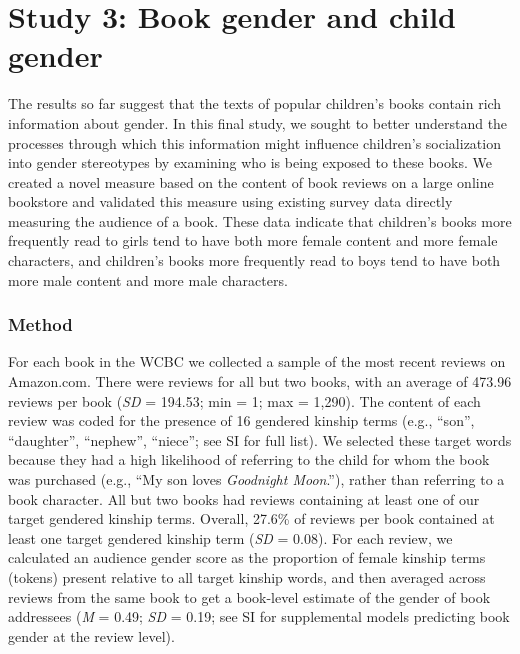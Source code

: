 \documentclass[
  english,
  ,man,floatsintext]{apa6}
\begin{document}
\hypertarget{study-3-book-gender-and-child-gender}{%
\section{Study 3: Book gender and child gender}\label{study-3-book-gender-and-child-gender}}

The results so far suggest that the texts of popular children's books contain rich information about gender. In this final study, we sought to better understand the processes through which this information might influence children's socialization into gender stereotypes by examining who is being exposed to these books. We created a novel measure based on the content of book reviews on a large online bookstore and validated this measure using existing survey data directly measuring the audience of a book. These data indicate that children's books more frequently read to girls tend to have both more female content and more female characters, and children's books more frequently read to boys tend to have both more male content and more male characters.

\hypertarget{method-3}{%
\subsubsection{Method}\label{method-3}}

For each book in the WCBC we collected a sample of the most recent reviews on Amazon.com. There were reviews for all but two books, with an average of 473.96 reviews per book (\emph{SD} = 194.53; min = 1; max = 1,290). The content of each review was coded for the presence of 16 gendered kinship terms (e.g., \enquote{son}, \enquote{daughter}, \enquote{nephew}, \enquote{niece}; see SI for full list). We selected these target words because they had a high likelihood of referring to the child for whom the book was purchased (e.g., \enquote{My son loves \emph{Goodnight Moon}.}), rather than referring to a book character. All but two books had reviews containing at least one of our target gendered kinship terms. Overall, 27.6\% of reviews per book contained at least one target gendered kinship term (\emph{SD} = 0.08). For each review, we calculated an audience gender score as the proportion of female kinship terms (tokens) present relative to all target kinship words, and then averaged across reviews from the same book to get a book-level estimate of the gender of book addressees (\emph{M} = 0.49; \emph{SD} = 0.19; see SI for supplemental models predicting book gender at the review level).
\end{document}
